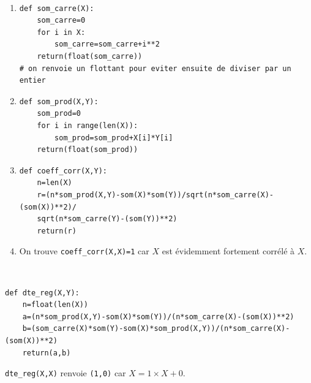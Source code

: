 \begin{solution}~\\
\vspace*{-0.7cm}
\begin{enumerate}
\item 
\begin{verbatim}
def som_carre(X):
    som_carre=0
    for i in X:
        som_carre=som_carre+i**2
    return(float(som_carre)) 
# on renvoie un flottant pour eviter ensuite de diviser par un entier   
\end{verbatim}
\item  \begin{verbatim}
def som_prod(X,Y):
    som_prod=0
    for i in range(len(X)):
        som_prod=som_prod+X[i]*Y[i]
    return(float(som_prod))  
\end{verbatim}

\item \begin{verbatim}
def coeff_corr(X,Y):
    n=len(X)
    r=(n*som_prod(X,Y)-som(X)*som(Y))/sqrt(n*som_carre(X)-(som(X))**2)/
    sqrt(n*som_carre(Y)-(som(Y))**2)   
    return(r) 
\end{verbatim}
\item On trouve \verb?coeff_corr(X,X)=1? car $X$ est \' evidemment fortement corr\' el\' e \` a $X$.
\end{enumerate}
\end{solution}



\begin{solution}~\\
\vspace*{-0.7cm}
 \begin{verbatim}
def dte_reg(X,Y):
    n=float(len(X))
    a=(n*som_prod(X,Y)-som(X)*som(Y))/(n*som_carre(X)-(som(X))**2)
    b=(som_carre(X)*som(Y)-som(X)*som_prod(X,Y))/(n*som_carre(X)-(som(X))**2)
    return(a,b)   
\end{verbatim}
\verb?dte_reg(X,X)? renvoie \verb?(1,0)? car $X=1\times X+0$.
\end{solution}

